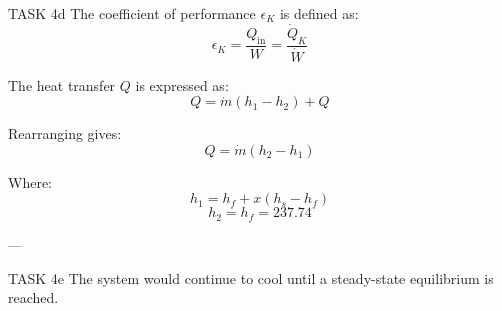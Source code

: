 TASK 4d  
The coefficient of performance \( \epsilon_K \) is defined as:  
\[
\epsilon_K = \frac{Q_{\text{in}}}{W} = \frac{\dot{Q}_K}{\dot{W}}
\]

The heat transfer \( Q \) is expressed as:  
\[
Q = \dot{m} (h_1 - h_2) + Q
\]

Rearranging gives:  
\[
Q = \dot{m} (h_2 - h_1)
\]

Where:  
\[
h_1 = h_f + x (h_s - h_f)
\]
\[
h_2 = h_f = 237.74
\]

---

TASK 4e  
The system would continue to cool until a steady-state equilibrium is reached.